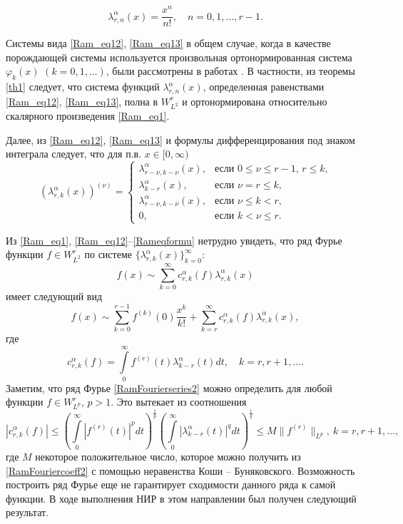 \begin{equation}\label{Ram_eq13}
\lambda_{r,n}^{\alpha}(x) =\frac{x^n}{n!}, \quad n=0,1,\ldots, r-1.
\end{equation}

Системы вида \eqref{Ram_eq12}, \eqref{Ram_eq13} в общем случае, когда в качестве порождающей системы используется произвольная ортонормированная система $\varphi_k(x)$ $(k=0,1,\ldots)$, были рассмотрены в работах \cite{SharIzv2018, rep2017-ramis-Gadz16, Shar2017, rep2017-ramis-Gadz1, rep2017-ramis-shGadjGadjMir}.
В частности, из теоремы \ref{th1} \cite{SharIzv2018} следует, что система функций $\lambda_{r,n}^\alpha(x)$, определенная равенствами \eqref{Ram_eq12}, \eqref{Ram_eq13}, полна в $W^r_{L^2}$ и ортонормирована относительно скалярного произведения \eqref{Ram_eq1}.

Далее, из \eqref{Ram_eq12}, \eqref{Ram_eq13} и формулы дифференцирования под знаком интеграла \cite[п. 509, с. 667]{rep2017-sobcheb_urav-fiht2} следует, что для п.в. $x\in[0,\infty)$
\begin{equation}\label{Rameqformu}
(\lambda_{r,k}^\alpha(x))^{(\nu)} =
\begin{cases}
\lambda_{r-\nu,k-\nu}^\alpha(x),&\text{если $0\le\nu\le r-1$, $r\le k$,}\\
\lambda_{k-r}^\alpha(x),&\text{если $\nu=r\le k$,}\\
\lambda_{r-\nu,k-\nu}^\alpha(x),&\text{если $\nu\le k< r$,}\\
0,&\text{если $k< \nu\le r$}.
\end{cases}
\end{equation}

Из \eqref{Ram_eq1}, \eqref{Ram_eq12}--\eqref{Rameqformu} нетрудно увидеть, что ряд Фурье функции $f\in W^r_{L^2}$ по системе  $\{\lambda^\alpha_{r,k}(x)\}_{k=0}^\infty$:
\begin{equation*}
f(x)\sim \sum_{k=0}^{\infty}c_{r,k}^\alpha(f)\lambda_{r,k}^\alpha(x)
\end{equation*}
имеет следующий вид
\begin{equation}\label{RamFourierseries2}
f(x)\sim \sum_{k=0}^{r-1}f^{(k)}(0)\frac{x^k}{k!}+\sum_{k=r}^{\infty} c_{r,k}^\alpha(f)\lambda_{r,k}^\alpha(x),
\end{equation}
где
\begin{equation}\label{RamFouriercoeff2}
c_{r,k}^\alpha(f)=\int\limits_0^\infty f^{(r)}(t)\lambda_{k-r}^\alpha(t)dt, \quad k=r, r+1, \ldots.
\end{equation}
Заметим, что ряд Фурье \eqref{RamFourierseries2} можно определить для любой функции $f\in W^r_{L^p}$, $p>1$. Это вытекает из соотношения 
$$
|c_{r,k}^\alpha(f)|\leq \left(\int\limits_0^\infty|f^{(r)}(t)|^p dt\right)^{\frac{1}{p}}
\left(\int\limits_0^\infty|\lambda_{k-r}^\alpha(t)|^q dt\right)^{\frac{1}{q}}\leq M\|f^{(r)}\|_{L^p},\ k=r, r+1, \ldots,
$$
где $M$ некоторое положительное число, которое можно получить из \eqref{RamFouriercoeff2} с помощью неравенства Коши -- Буняковского. 
Возможность построить ряд Фурье еще не гарантирует сходимости данного ряда к самой функции. В ходе выполнения НИР в этом направлении был получен следующий результат.

